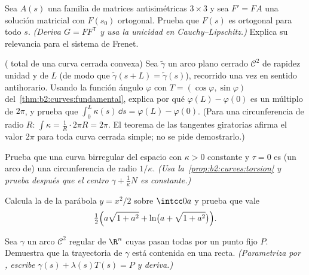 \begin{exercise}[$\star\star\star$]\label{exo:b2:curves:7}
Sea $A(s)$ una familia  de matrices antisimétricas $3 \times
3$ y sea $F' = F A$ una solución matricial con $F(s_0)$ ortogonal.
Prueba que $F(s)$ es ortogonal para todo $s$. \emph{(Deriva $G = F
F^{\mathsf T}$ y usa la unicidad en Cauchy--Lipschitz.)} Explica su
relevancia para el sistema de Frenet.
\end{exercise}

\begin{exercise}[$\star\star\star$]\label{exo:b2:curves:8}
( total de una curva cerrada convexa) Sea $\tilde\gamma$
un arco plano cerrado $\mathcal{C}^2$ de rapidez unidad y de
 $L$ (de modo que $\tilde\gamma(s + L) = \tilde\gamma(s)$),
recorrido una vez en sentido antihorario. Usando la función ángulo
$\varphi$ con $T = (\cos\varphi, \sin\varphi)$ del~\cref{thm:b2:curves:fundamental}, explica por qué $\varphi(L) -
\varphi(0)$ es un múltiplo de $2\pi$, y prueba que $\int_0^L
\kappa(s)\,\dd s = \varphi(L) - \varphi(0)$. (Para una
circunferencia de radio $R$: $\int \kappa = \frac1R \cdot 2\pi R =
2\pi$. El teorema de las tangentes giratorias afirma el valor $2\pi$
para toda curva cerrada simple; no se pide demostrarlo.)
\end{exercise}

\begin{exercise}[$\star\star\star$]\label{exo:b2:curves:9}
Prueba que una curva birregular del espacio con $\kappa > 0$
constante y $\tau = 0$ es (un arco de) una circunferencia de radio
$1/\kappa$. \emph{(Usa la~\cref{prop:b2:curves:torsion} y prueba
después que el centro $\gamma + \frac1\kappa N$ es constante.)}
\end{exercise}

\begin{exercise}[$\star$]\label{exo:b2:curves:10}
Calcula la  de la parábola $y = x^2/2$ sobre
$\intcc0a$ y prueba que vale
\[
\tfrac12\Bigl(a\sqrt{1 + a^2} + \ln\bigl(a + \sqrt{1 +
a^2}\bigr)\Bigr).
\]
\end{exercise}

\begin{exercise}[$\star\star$]\label{exo:b2:curves:11}
Sea $\gamma$ un arco $\mathcal C^2$ regular de $\R^n$ cuyas
 pasan todas por un punto fijo $P$. Demuestra que la
trayectoria de $\gamma$ está contenida en una recta.
\emph{(Parametriza por , escribe $\gamma(s) +
\lambda(s)T(s) = P$ y deriva.)}
\end{exercise}

